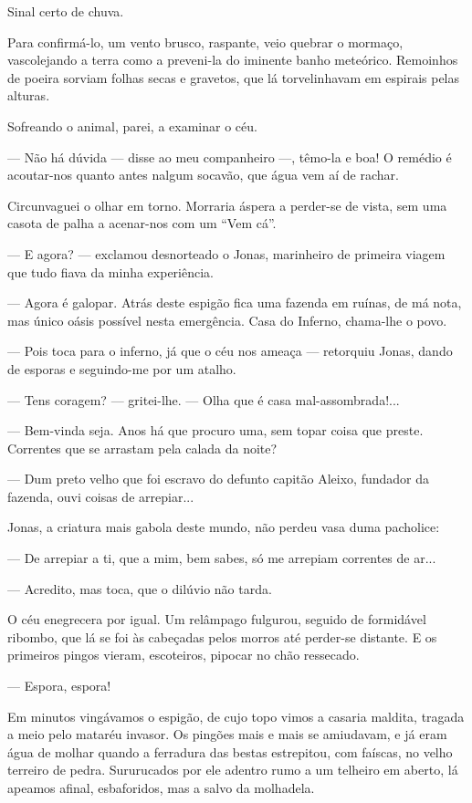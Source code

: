 Sinal certo de chuva.

Para confirmá-lo, um vento brusco, raspante, veio quebrar o mormaço,
vascolejando a terra como a preveni-la do iminente banho meteórico.
Remoinhos de poeira sorviam folhas secas e gravetos, que lá
torvelinhavam em espirais pelas alturas.

Sofreando o animal, parei, a examinar o céu.

--- Não há dúvida --- disse ao meu companheiro ---, têmo-la e boa! O
remédio é acoutar-nos quanto antes nalgum socavão, que água vem aí de
rachar.

Circunvaguei o olhar em torno. Morraria áspera a perder-se de vista, sem
uma casota de palha a acenar-nos com um ``Vem cá''.

--- E agora? --- exclamou desnorteado o Jonas, marinheiro de primeira
viagem que tudo fiava da minha experiência.

--- Agora é galopar. Atrás deste espigão fica uma fazenda em ruínas, de
má nota, mas único oásis possível nesta emergência. Casa do Inferno,
chama-lhe o povo.

--- Pois toca para o inferno, já que o céu nos ameaça --- retorquiu
Jonas, dando de esporas e seguindo-me por um atalho.

--- Tens coragem? --- gritei-lhe. --- Olha que é casa mal-assombrada!...

--- Bem-vinda seja. Anos há que procuro uma, sem topar coisa que preste.
Correntes que se arrastam pela calada da noite?

--- Dum preto velho que foi escravo do defunto capitão Aleixo, fundador
da fazenda, ouvi coisas de arrepiar...

Jonas, a criatura mais gabola deste mundo, não perdeu vasa duma
pacholice:

--- De arrepiar a ti, que a mim, bem sabes, só me arrepiam correntes de
ar...

--- Acredito, mas toca, que o dilúvio não tarda.

O céu enegrecera por igual. Um relâmpago fulgurou, seguido de formidável
ribombo, que lá se foi às cabeçadas pelos morros até perder-se distante.
E os primeiros pingos vieram, escoteiros, pipocar no chão ressecado.

--- Espora, espora!

Em minutos vingávamos o espigão, de cujo topo vimos a casaria maldita,
tragada a meio pelo mataréu invasor. Os pingões mais e mais se
amiudavam, e já eram água de molhar quando a ferradura das bestas
estrepitou, com faíscas, no velho terreiro de pedra. Sururucados por ele
adentro rumo a um telheiro em aberto, lá apeamos afinal, esbaforidos,
mas a salvo da molhadela.

